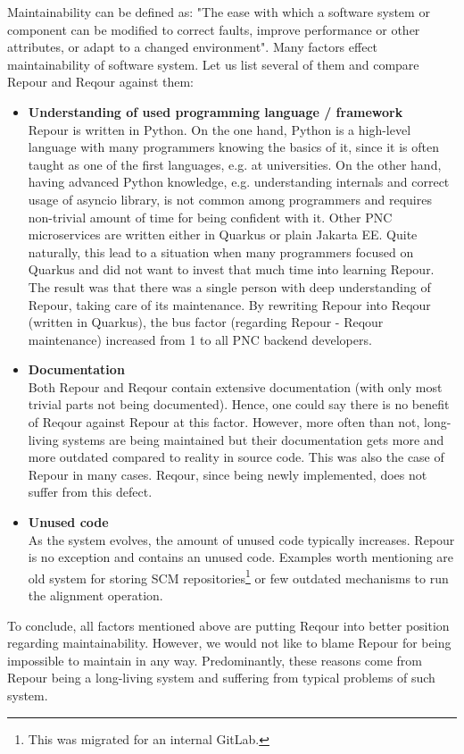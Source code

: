\documentclass[../main.tex]{subfiles}
\begin{document}
Maintainability can be defined as: "The ease with which a software system or component can be modified to correct faults, improve performance
or other attributes, or adapt to a changed environment"\cite{software-glossary}. Many factors effect maintainability of software system. Let us list several of them and compare Repour and Reqour against them:
\begin{itemize}
    \item \textbf{Understanding of used programming language / framework}\\
    Repour is written in Python. On the one hand, Python is a high-level language with many programmers knowing the basics of it, since it is often taught as one of the first languages, e.g. at universities. On the other hand, having advanced Python knowledge, e.g. understanding internals and correct usage of asyncio library, is not common among programmers and requires non-trivial amount of time for being confident with it. Other PNC microservices are written either in Quarkus or plain Jakarta EE. Quite naturally, this lead to a situation when many programmers focused on Quarkus and did not want to invest that much time into learning Repour. The result was that there was a single person with deep understanding of Repour, taking care of its maintenance. By rewriting Repour into Reqour (written in Quarkus), the bus factor (regarding Repour - Reqour maintenance) increased from 1 to all PNC backend developers.

    \item \textbf{Documentation}\\
    Both Repour and Reqour contain extensive documentation (with only most trivial parts not being documented). Hence, one could say there is no benefit of Reqour against Repour at this factor. However, more often than not, long-living systems are being maintained but their documentation gets more and more outdated compared to reality in source code. This was also the case of Repour in many cases. Reqour, since being newly implemented, does not suffer from this defect.

    \item \textbf{Unused code}\\
    As the system evolves, the amount of unused code typically increases. Repour is no exception and contains an unused code. Examples worth mentioning are old system for storing SCM repositories\footnote{This was migrated for an internal GitLab.} or few outdated mechanisms to run the alignment operation.
\end{itemize}

To conclude, all factors mentioned above are putting Reqour into better position regarding maintainability. However, we would not like to blame Repour for being impossible to maintain in any way. Predominantly, these reasons come from Repour being a long-living system and suffering from typical problems of such system.
\end{document}
